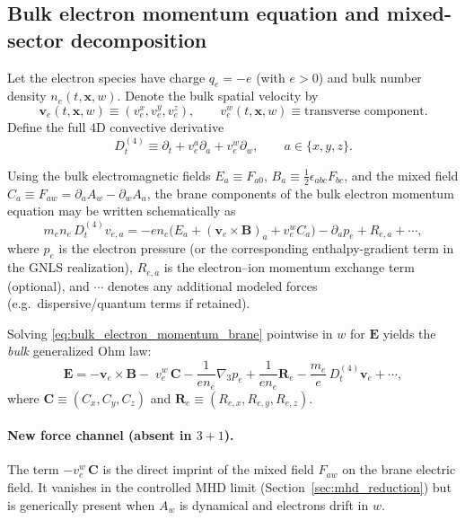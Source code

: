 \documentclass[11pt]{article}
\newcommand{\gradthree}{\nabla_3}
\begin{document}
\subsection{Bulk electron momentum equation and mixed-sector decomposition}
\label{subsec:ohm_bulk}

Let the electron species have charge \(q_e=-e\) (with \(e>0\)) and bulk number density
\(n_e(t,\mathbf{x},w)\). Denote the bulk spatial velocity by
\begin{equation}
\mathbf{v}_e(t,\mathbf{x},w)\equiv (v_e^x,v_e^y,v_e^z),
\qquad
v_e^w(t,\mathbf{x},w)\equiv \text{transverse component}.
\end{equation}
Define the full \(4\)D convective derivative
\begin{equation}
D_t^{(4)} \equiv \partial_t + v_e^a\partial_a + v_e^w\partial_w,
\qquad a\in\{x,y,z\}.
\label{eq:Dt4_def}
\end{equation}

Using the bulk electromagnetic fields
\(
E_a\equiv F_{a0}
\),
\(
B_a\equiv \tfrac12\epsilon_{abc}F_{bc}
\),
and the mixed field
\(
C_a\equiv F_{aw}=\partial_a A_w-\partial_w A_a
\),
the brane components of the bulk electron momentum equation may be written schematically as
\begin{equation}
m_e n_e\,D_t^{(4)} v_{e,a}
=
-e n_e\Big(E_a + (\mathbf{v}_e\times\mathbf{B})_a + v_e^w C_a\Big)
-\partial_a p_e
+R_{e,a}
+\cdots,
\label{eq:bulk_electron_momentum_brane}
\end{equation}
where \(p_e\) is the electron pressure (or the corresponding enthalpy-gradient term in the
GNLS realization), \(R_{e,a}\) is the electron--ion momentum exchange term (optional), and
\(\cdots\) denotes any additional modeled forces (e.g.\ dispersive/quantum terms if retained).

Solving \eqref{eq:bulk_electron_momentum_brane} pointwise in \(w\) for \(\mathbf{E}\) yields the
\emph{bulk} generalized Ohm law:
\begin{equation}
\mathbf{E}
=
-\mathbf{v}_e\times\mathbf{B}
-\;v_e^w\,\mathbf{C}
-\frac{1}{e n_e}\gradthree p_e
+\frac{1}{e n_e}\mathbf{R}_e
-\frac{m_e}{e}\,D_t^{(4)}\mathbf{v}_e
+\cdots,
\label{eq:ohm_bulk_pointwise}
\end{equation}
where \(\mathbf{C}\equiv (C_x,C_y,C_z)\) and \(\mathbf{R}_e\equiv (R_{e,x},R_{e,y},R_{e,z})\).

\paragraph{New force channel (absent in \(3+1\)).}
The term \(-v_e^w\,\mathbf{C}\) is the direct imprint of the mixed field \(F_{aw}\) on the
brane electric field. It vanishes in the controlled MHD limit
(Section~\ref{sec:mhd_reduction}) but is generically present when \(A_w\) is dynamical and
electrons drift in \(w\).
\end{document}
